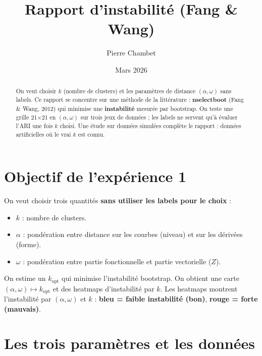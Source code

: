 \documentclass[11pt, a4paper]{article}
\title{Rapport d'instabilité (Fang \& Wang)}
\author{Pierre Chambet}
\date{Mars 2026}
\begin{document}
\maketitle

\begin{abstract}
On veut choisir $k$ (nombre de clusters) et les paramètres de distance
$(\alpha,\omega)$ sans labels. Ce rapport se concentre sur une méthode de la
littérature : \textbf{nselectboot} (Fang \& Wang, 2012) qui minimise une \textbf{instabilité} mesurée par
bootstrap. On teste une grille 21×21 en
$(\alpha,\omega)$ sur trois jeux de données ; les labels ne servent qu'à
évaluer l'ARI une fois $k$ choisi. Une étude sur données simulées complète le rapport : données artificielles
où le vrai $k$ est connu.
\end{abstract}

\tableofcontents
\newpage

\section{Objectif de l'expérience 1}

On veut choisir trois quantités \textbf{sans utiliser les labels pour le choix} :

\begin{itemize}
  \item \textbf{$k$} : nombre de clusters.
  \item \textbf{$\alpha$} : pondération entre distance sur les courbes (niveau)
    et sur les dérivées (forme).
  \item \textbf{$\omega$} : pondération entre partie fonctionnelle et partie
    vectorielle ($Z$).
\end{itemize}

On estime un $k_\text{opt}$ qui minimise l'instabilité bootstrap.
On obtient une carte $(\alpha,\omega) \mapsto k_\text{opt}$ et des heatmaps
d'instabilité par $k$. Les heatmaps montrent l'instabilité par $(\alpha,\omega)$
et $k$ : \textbf{bleu = faible instabilité (bon)}, \textbf{rouge = forte (mauvais)}.

\section{Les trois paramètres et les données}
\end{document}
